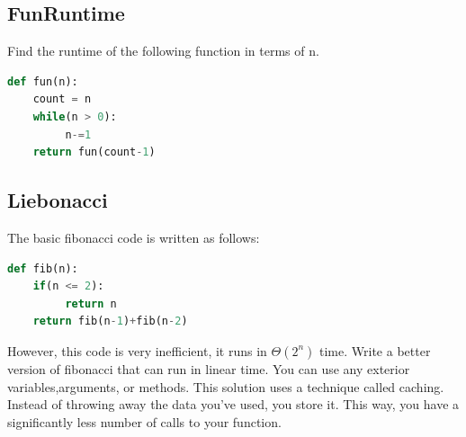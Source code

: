 \documentclass{article}
\begin{document}
\subsection{FunRuntime}
Find the runtime of the following function in terms of n.
\begin{lstlisting}[language = Python]
def fun(n):
	count = n
	while(n > 0):
	     n-=1
	return fun(count-1)
\end{lstlisting}
\bigskip
\bigskip
\bigskip
\bigskip
\bigskip
\bigskip
\bigskip
\bigskip
\subsection{Liebonacci}
The basic fibonacci code is written as follows: 
\begin{lstlisting}[language = Python]
def fib(n):
	if(n <= 2):
	     return n
	return fib(n-1)+fib(n-2)
\end{lstlisting}
However, this code is very inefficient, it runs in $\Theta(2^{n})$ time. Write a better version of fibonacci that can run in linear time. You can use any exterior variables,arguments, or methods. 
This solution uses a technique called caching. Instead of throwing away the data you've used, you store it. This way, you have a significantly less number of calls to your function.
\bigskip
\bigskip
\bigskip
\bigskip
\bigskip
\bigskip
\bigskip
\bigskip
\bigskip
\bigskip
\bigskip
\bigskip
\bigskip
\bigskip
\bigskip
\bigskip
\end{document}
